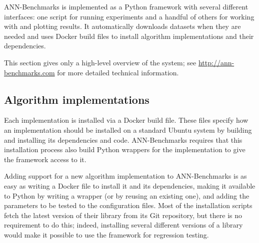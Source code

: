 \textsf{ANN-Benchmarks} is implemented as a Python framework with several
different interfaces: one script for running experiments and a handful of
others for
working with and plotting results. It automatically downloads datasets when
they are needed and uses Docker build files to install algorithm implementations
and their dependencies.


This section gives only a high-level overview of the system; see
\url{http://ann-benchmarks.com} for more detailed technical
information.

\subsection{Algorithm implementations}

Each implementation is installed via a Docker build file. These files specify
how an implementation should be installed on a standard Ubuntu system by
building and installing its dependencies and code. ANN-Benchmarks requires that
this installation process also build Python wrappers for the implementation
to give the framework access to it. 

%

Adding support for a new algorithm implementation to \textsf{ANN-Benchmarks} is
as easy as
writing a Docker file to install it and its dependencies, making it available to
Python by writing a wrapper (or by reusing an existing one), and adding the
parameters to be tested to the configuration files. Most of the installation
scripts fetch the latest version of their library from its Git repository,
but there is no requirement to do this; indeed, installing several different
versions of a library would make it possible to use the framework for
regression testing.

